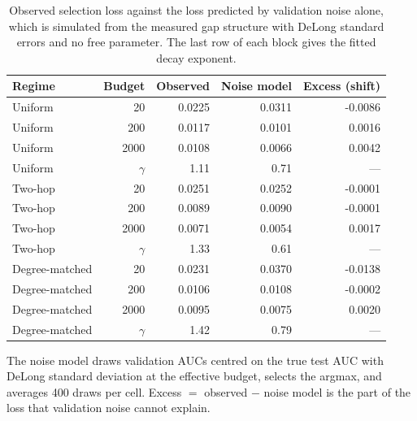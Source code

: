 \begin{table}[htbp]
\centering
\footnotesize
\caption{Observed selection loss against the loss predicted by validation noise alone, which is simulated from the measured gap structure with DeLong standard errors and no free parameter. The last row of each block gives the fitted decay exponent.}
\label{tab:theory}
\begin{tabular}{l r r r r}
\toprule
Regime & Budget & Observed & Noise model & Excess (shift) \\
\midrule
Uniform & 20 & 0.0225 & 0.0311 & -0.0086 \\
Uniform & 200 & 0.0117 & 0.0101 & 0.0016 \\
Uniform & 2000 & 0.0108 & 0.0066 & 0.0042 \\
\addlinespace[2pt]
Uniform & $\gamma$ & 1.11 & 0.71 & --- \\
Two-hop & 20 & 0.0251 & 0.0252 & -0.0001 \\
Two-hop & 200 & 0.0089 & 0.0090 & -0.0001 \\
Two-hop & 2000 & 0.0071 & 0.0054 & 0.0017 \\
\addlinespace[2pt]
Two-hop & $\gamma$ & 1.33 & 0.61 & --- \\
Degree-matched & 20 & 0.0231 & 0.0370 & -0.0138 \\
Degree-matched & 200 & 0.0106 & 0.0108 & -0.0002 \\
Degree-matched & 2000 & 0.0095 & 0.0075 & 0.0020 \\
\addlinespace[2pt]
Degree-matched & $\gamma$ & 1.42 & 0.79 & --- \\
\bottomrule
\end{tabular}
\par\vspace{2pt}\begin{minipage}{\linewidth}\footnotesize The noise model draws validation AUCs centred on the true test AUC with DeLong standard deviation at the effective budget, selects the argmax, and averages 400 draws per cell. Excess $=$ observed $-$ noise model is the part of the loss that validation noise cannot explain.\end{minipage}
\end{table}
